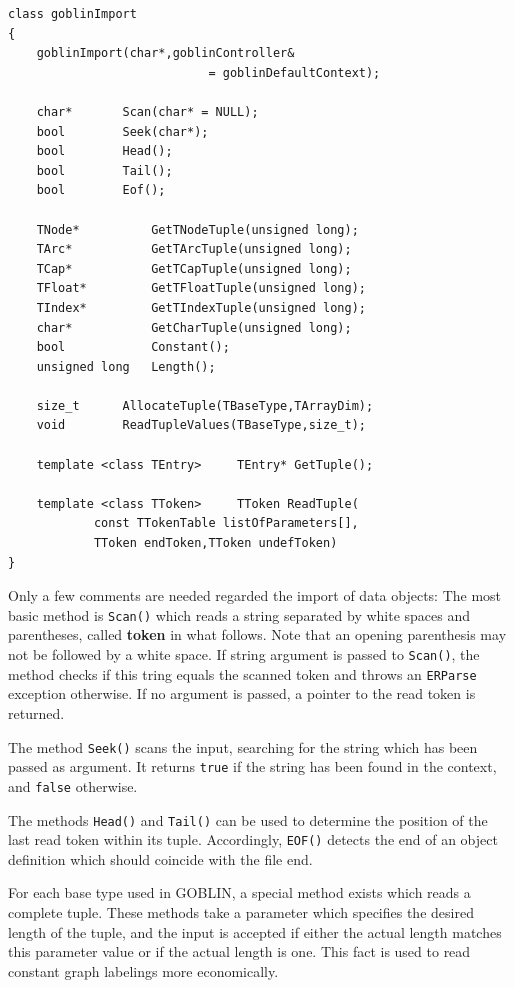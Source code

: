 \documentclass[a4paper,11pt,twoside]{book}
\begin{document}
\begin{multicols}{2}
\begin{mymethods}
\begin{verbatim}
class goblinImport
{
    goblinImport(char*,goblinController&
                            = goblinDefaultContext);

    char*       Scan(char* = NULL);
    bool        Seek(char*);
    bool        Head();
    bool        Tail();
    bool        Eof();

    TNode*          GetTNodeTuple(unsigned long);
    TArc*           GetTArcTuple(unsigned long);
    TCap*           GetTCapTuple(unsigned long);
    TFloat*         GetTFloatTuple(unsigned long);
    TIndex*         GetTIndexTuple(unsigned long);
    char*           GetCharTuple(unsigned long);
    bool            Constant();
    unsigned long   Length();

    size_t      AllocateTuple(TBaseType,TArrayDim);
    void        ReadTupleValues(TBaseType,size_t);

    template <class TEntry>     TEntry* GetTuple();

    template <class TToken>     TToken ReadTuple(
            const TTokenTable listOfParameters[],
            TToken endToken,TToken undefToken)
}
\end{verbatim}
\end{mymethods}
Only a few comments are needed regarded the import of data objects:
The most basic method is \verb/Scan()/ which reads a string separated by white
spaces and parentheses, called {\bf token} in what
follows. Note that an opening parenthesis may not be followed by a white space.
If string argument is passed to \verb/Scan()/, the method checks if this tring
equals the scanned token and throws an \verb/ERParse/ exception otherwise.
If no argument is passed, a pointer to the read token is returned.

The method \verb/Seek()/ scans the input, searching for the string which
has been passed as argument. It returns \verb/true/ if the string has been
found in the context, and \verb/false/ otherwise.

The methods \verb/Head()/ and \verb/Tail()/ can be used to determine the
position of the last read token within its tuple. Accordingly, \verb/EOF()/
detects the end of an object definition which should coincide with the file end.

For each base type used in GOBLIN, a special method exists which reads a
complete tuple. These methods take a parameter which specifies the desired
length of the tuple, and the input is accepted if either the actual length
matches this parameter value or if the actual length is one. This fact is
used to read constant graph labelings more economically.


\end{multicols}
\end{document}

